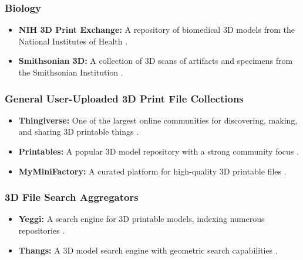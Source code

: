 \subsubsection{Biology}
\begin{itemize}
	\item \textbf{NIH 3D Print Exchange:} A repository of biomedical 3D models from the National Institutes of Health \supercite{NIH3D}.
	\item \textbf{Smithsonian 3D:} A collection of 3D scans of artifacts and specimens from the Smithsonian Institution \supercite{Smithsonian3D}.
\end{itemize}

\subsubsection{General User-Uploaded 3D Print File Collections}
\begin{itemize}
	\item \textbf{Thingiverse:} One of the largest online communities for discovering, making, and sharing 3D printable things \supercite{Thingiverse}.
	\item \textbf{Printables:} A popular 3D model repository with a strong community focus \supercite{Printables}.
	\item \textbf{MyMiniFactory:} A curated platform for high-quality 3D printable files \supercite{MyMiniFactory}.
\end{itemize}

\subsubsection{3D File Search Aggregators}
\begin{itemize}
	\item \textbf{Yeggi:} A search engine for 3D printable models, indexing numerous repositories \supercite{Yeggi}.
	\item \textbf{Thangs:} A 3D model search engine with geometric search capabilities \supercite{Thangs}.
\end{itemize}

